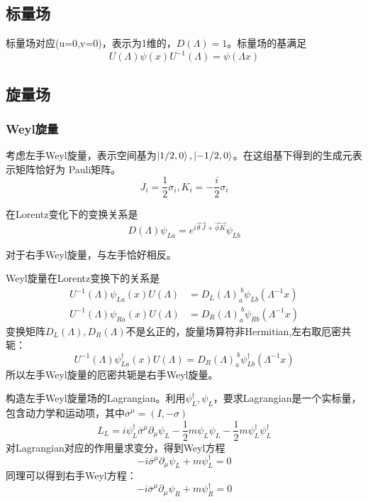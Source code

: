 \documentclass[10pt]{ctexart}
\begin{document}
\subsection{标量场}
标量场对应(u=0,v=0)，表示为1维的，$D(\Lambda)=1$。标量场的基满足
\begin{equation}
    U(\Lambda)\psi(x)U^{-1}(\Lambda)=\psi(\Lambda x)
\end{equation}
\subsection{旋量场}
\subsubsection{Weyl旋量}
考虑左手Weyl旋量，表示空间基为$\ket{1/2,0},\ket{-1/2,0}$。在这组基下得到的生成元表示矩阵恰好为
Pauli矩阵。
\begin{equation}
    J_i=\frac{1}{2}\sigma_i, K_i=-\frac{i}{2}\sigma_i
\end{equation}

在Lorentz变化下的变换关系是
\begin{equation}
    D(\Lambda)\psi_{La}=e^{i\vec{\theta}\vec{J}+\vec{\phi}\vec{K}}\psi_{Lb}
\end{equation}

对于右手Weyl旋量，与左手恰好相反。

Weyl旋量在Lorentz变换下的关系是
\begin{align}
    U^{-1}(\Lambda)\psi_{La}(x)U(\Lambda)&=D_L(\Lambda)^{\ b}_{a}\psi_{Lb}(\Lambda^{-1}x)\\
    U^{-1}(\Lambda)\psi_{Ra}(x)U(\Lambda)&=D_R(\Lambda)^{\ b}_{a}\psi_{Rb}(\Lambda^{-1}x)
\end{align}
变换矩阵$D_L(\Lambda),D_R(\Lambda)$不是幺正的，旋量场算符非Hermitian,左右取厄密共轭：
\begin{equation}
    U^{-1}(\Lambda)\psi^\dagger_{La}(x)U(\Lambda)=D_R(\Lambda)^{\ b}_{a}\psi^\dagger_{Lb}(\Lambda^{-1}x)
\end{equation}
所以左手Weyl旋量的厄密共轭是右手Weyl旋量。

构造左手Weyl旋量场的Lagrangian。利用$\psi^\dagger_L,\psi_L$，要求Lagrangian是一个实标量，包含动力学和运动项，其中$\overline{\sigma}^{\mu}=(I,-\sigma)$
\begin{equation}
    L_L=i\psi^\dagger_L\overline{\sigma}^\mu\partial_\mu\psi_L-\frac{1}{2}m\psi_L\psi_L-\frac{1}{2}m\psi^\dagger_L\psi^\dagger_L
\end{equation}
对Lagrangian对应的作用量求变分，得到Weyl方程
\begin{equation}
    -i\overline{\sigma}^\mu\partial_\mu\psi_L+m\psi^\dagger_L=0
\end{equation}
同理可以得到右手Weyl方程：
\begin{equation}
    -i\overline{\sigma}^\mu\partial_\mu\psi_R+m\psi^\dagger_R=0
\end{equation}
\end{document}
